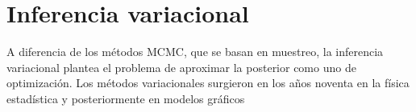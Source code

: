 \documentclass[main.tex]{subfiles}
\begin{document}
\chapter*{Inferencia variacional}
A diferencia de los métodos MCMC, que se basan en muestreo,  la inferencia
variacional plantea el problema de aproximar la posterior como uno de
optimización. Los métodos variacionales surgieron en los años noventa en la
física estadística y posteriormente en modelos gráficos \cite{advances-vi}
\biblio{}
\end{document}
